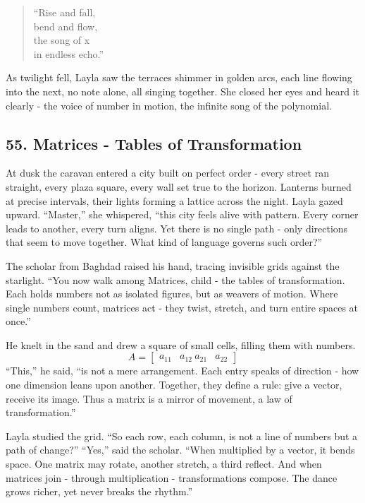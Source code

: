 \documentclass[
  letterpaper,
  DIV=11,
  numbers=noendperiod]{scrreprt}
\begin{document}
\begin{quote}
``Rise and fall,\\
bend and flow,\\
the song of x\\
in endless echo.''
\end{quote}

As twilight fell, Layla saw the terraces shimmer in golden arcs, each
line flowing into the next, no note alone, all singing together. She
closed her eyes and heard it clearly - the voice of number in motion,
the infinite song of the polynomial.

\subsection{55. Matrices - Tables of
Transformation}\label{matrices---tables-of-transformation}

At dusk the caravan entered a city built on perfect order - every street
ran straight, every plaza square, every wall set true to the horizon.
Lanterns burned at precise intervals, their lights forming a lattice
across the night. Layla gazed upward. ``Master,'' she whispered, ``this
city feels alive with pattern. Every corner leads to another, every turn
aligns. Yet there is no single path - only directions that seem to move
together. What kind of language governs such order?''

The scholar from Baghdad raised his hand, tracing invisible grids
against the starlight. ``You now walk among Matrices, child - the tables
of transformation. Each holds numbers not as isolated figures, but as
weavers of motion. Where single numbers count, matrices act - they
twist, stretch, and turn entire spaces at once.''

He knelt in the sand and drew a square of small cells, filling them with
numbers. \[
A =
\begin{bmatrix}
a_{11} & a_{12} \
a_{21} & a_{22}
\end{bmatrix}
\] ``This,'' he said, ``is not a mere arrangement. Each entry speaks of
direction - how one dimension leans upon another. Together, they define
a rule: give a vector, receive its image. Thus a matrix is a mirror of
movement, a law of transformation.''

Layla studied the grid. ``So each row, each column, is not a line of
numbers but a path of change?'' ``Yes,'' said the scholar. ``When
multiplied by a vector, it bends space. One matrix may rotate, another
stretch, a third reflect. And when matrices join - through
multiplication - transformations compose. The dance grows richer, yet
never breaks the rhythm.''
\end{document}

